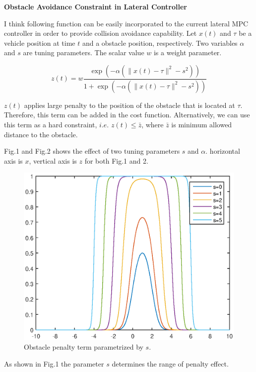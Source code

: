 \documentclass[12pt]{article}
\begin{document}

\noindent
\begin{center}
 \textbf{Obstacle Avoidance Constraint in Lateral Controller}
\vspace{0.5cm}
\noindent
\vspace{0.5cm}
\end{center}
I think following function can be easily incorporated to the current lateral MPC controller in order to provide collision avoidance capability. 
Let $x(t)$ and $\tau$ be a vehicle position at time $t$ and a obstacle position, respectively. Two variables $\alpha$ and $s$ are tuning parameters. The scalar value $w$ is a weight parameter.

\begin{equation}
z(t) = w\frac{\exp(-\alpha(\|x(t)-\tau\|^2-s^2))}{1+\exp(-\alpha(\|x(t)-\tau\|^2-s^2))}
\end{equation}

$z(t)$ applies large penalty to the position of the obstacle that is located at $\tau$. Therefore, this term can be added in the cost function. Alternatively, we can use this term as a hard constraint, $i.e.$ $z(t) \leq \bar{z}$, where $\bar{z}$ is minimum allowed distance to the obstacle.

Fig.1 and Fig.2 shows the effect of two tuning parameters $s$ and $\alpha$.
horizontal axis is $x$, vertical axis is $z$ for both Fig.1 and 2.
\begin{figure}[h!]
\begin{centering}
\includegraphics[width=12cm]{./Figures/bell1.eps}
\par\end{centering}
\caption{Obstacle penalty term parametrized by $s$.}
\end{figure}
As shown in Fig.1 the parameter $s$ determines the range of penalty effect.
\end{document}

